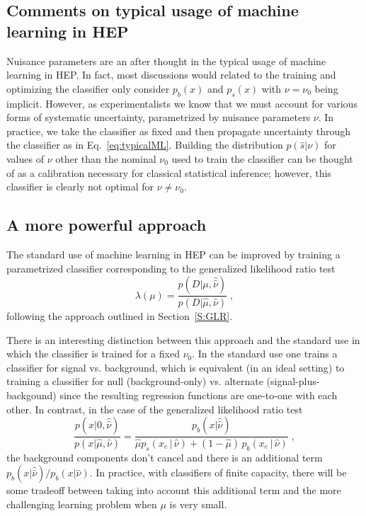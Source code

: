 \documentclass[aoas,preprint]{imsart}
\numberwithin{equation}{section}
\theoremstyle{plain}
\begin{document}
\subsection{Comments on typical usage of machine learning in HEP}

Nuisance parameters are an after thought in the typical usage of machine learning in HEP. In fact, most discussions would related to the training and optimizing the classifier only consider $p_b(x)$ and $p_s(x)$ with $\nu=\nu_0$ being implicit. However, as experimentalists we know that we must account for various forms of systematic uncertainty, parametrized by nuisance parameters $\nu$. In practice, we take the classifier as fixed and then propagate uncertainty through the classifier as in Eq.~\ref{eq:typicalML}. Building the distribution $p(\hat s|\nu)$ for values of $\nu$ other than the nominal $\nu_0$ used to train the classifier can be thought of as a calibration necessary for classical statistical inference; however, this classifier is clearly not optimal for $\nu \ne \nu_0$.

\subsection{A more powerful  approach}

The standard use of machine learning in HEP can be improved by training a parametrized classifier corresponding to the generalized likelihood ratio test 
\begin{equation}
\lambda(\mu) = \frac{p(D|\mu, \hat{\hat{\nu}})}{p(D|\hat \mu, {\hat{\nu}})} \;,
\end{equation}
following the approach outlined in Section~\ref{S:GLR}. 

There is an interesting distinction between this approach and the standard use in which the classifier is trained for a fixed $\nu_0$. In the standard use one trains a classifier for signal vs. background, which is equivalent (in an ideal setting) to training a classifier for  null (background-only) vs. alternate (signal-plus-backgound) since the resulting regression functions are one-to-one with each other.
In contrast, in the case of the generalized likelihood ratio test 
\begin{equation}\label{eq:hep_improved}
 \frac{p(x| 0, \hat{\hat{ \nu}})}{p(x|\hat \mu, \hat\nu)} =  \frac{p_b(x| \hat{\hat{ \nu}})}{ \hat \mu p_s( x_e \, |\,  \hat\nu)  + (1- \hat \mu )\, p_b( x_e \,|\, \hat \nu)} \; ,
\end{equation}
the background components don't cancel and there is an additional term $p_b(x| \hat{\hat{ \nu}})/p_b(x| {\hat{ \nu}})$.
In practice, with classifiers of finite capacity, there will be some tradeoff between taking into account this additional term and the more challenging learning problem when $\mu$ is very small. 
\end{document}
